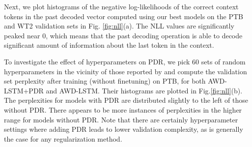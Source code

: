 \documentclass{article} \usepackage{iclr2019_conference,times}
\begin{document}
Next, we plot histograms of the negative log-likelihoods of the correct context tokens  in the past decoded vector  computed using our best models on the PTB and WT2 validation sets in Fig. \ref{fig:nll}(a). The NLL values are significantly peaked near 0, which means that the past decoding operation is able to decode significant amount of information about the last token in the context. 

To investigate the effect of hyperparameters on PDR, we pick 60 sets of random hyperparameters in the vicinity of  those reported by \cite{Merity2018} and compute the validation set perplexity after training (without finetuning) on PTB, for both AWD-LSTM+PDR and AWD-LSTM. Their histograms are plotted in Fig.\ref{fig:nll}(b). The perplexities for models with PDR are distributed slightly to the left of those without PDR. There appears to be more instances of perplexities in the higher range for models without PDR. 
Note that there are certainly hyperparameter settings where adding PDR leads to lower validation complexity, as is generally the case for any regularization method. 
\end{document}
